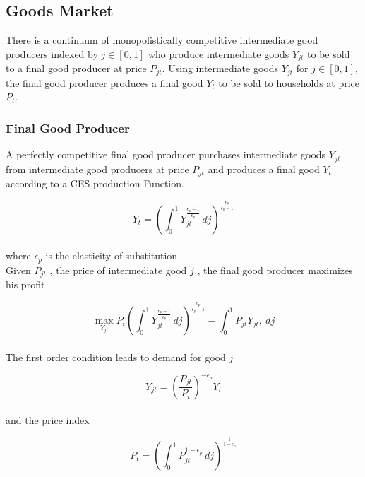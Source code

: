 \documentclass[titlepage]{\econtex}\providecommand{\texname}{Dissertation-Proposal}
\begin{document}
\hypertarget{Goods Market}{}
\subsection{Goods Market}

There is a continuum of  monopolistically competitive intermediate good producers indexed by $j \in [0,1]$ who produce intermediate goods $Y_{jt}$ to be sold to a final good producer at price $P_{jt}$. Using intermediate goods $Y_{jt}$ for $j \in [0,1]$, the  final good producer produces a final good $Y_{t}$ to be sold to households at price $P_{t}$.  \\ 


\hypertarget{Final Good Producer}{}
\subsubsection{Final Good Producer}

A perfectly competitive final good producer purchases intermediate goods $Y_{jt}$ from intermediate good producers at price $P_{jt}$ and produces a final good $Y_{t}$ according to a CES production Function. 

$$ Y_{t} = \left(\int_{0}^{1} Y_{jt}^{\frac{\epsilon_{p}-1}{\epsilon_{p}}}\, dj\right)^{\frac{\epsilon_{p}}{\epsilon_{p}-1}}$$ \\

where $\epsilon_{p}$ is the elasticity of substitution. \\ 

Given $P_{jt}$ , the price of intermediate good $j$ ,  the final good producer maximizes his profit

$$ \max_{Y_{jt}} P_{t} \left(\int_{0}^{1} Y_{jt}^{\frac{\epsilon_{p}-1}{\epsilon_{p}}}\, dj\right)^{\frac{\epsilon_{p}}{\epsilon_{p}-1}} - \int_{0}^{1} P_{jt} Y_{jt} ,\ dj $$ \\


The first order condition leads to demand for good $j$

\begin{equation} Y_{jt} = \left(\frac {P_{jt}}{P_{t}}\right)^{- \epsilon_{p}} Y_{t}\end{equation} \\

and the price index

\begin{equation} P_{t} = \left(\int_{0}^{1} P_{jt}^{1-\epsilon_{p}}\,dj \right )^{\frac{1}{1-\epsilon_{p}}} \end{equation}
\end{document}
